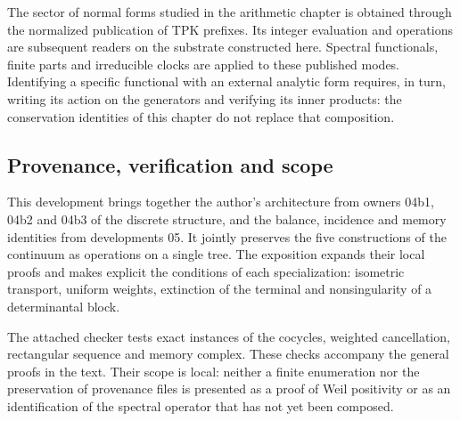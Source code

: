 The sector of normal forms studied in the arithmetic chapter is obtained through the normalized publication of TPK prefixes. Its integer evaluation and operations are subsequent readers on the substrate constructed here. Spectral functionals, finite parts and irreducible clocks are applied to these published modes. Identifying a specific functional with an external analytic form requires, in turn, writing its action on the generators and verifying its inner products: the conservation identities of this chapter do not replace that composition.

\clearpage
\subsection{Provenance, verification and scope}
This development brings together the author's architecture from owners 04b1, 04b2 and 04b3 of the discrete structure, and the balance, incidence and memory identities from developments 05. It jointly preserves the five constructions of the continuum as operations on a single tree. The exposition expands their local proofs and makes explicit the conditions of each specialization: isometric transport, uniform weights, extinction of the terminal and nonsingularity of a determinantal block.

The attached checker tests exact instances of the cocycles, weighted cancellation, rectangular sequence and memory complex. These checks accompany the general proofs in the text. Their scope is local: neither a finite enumeration nor the preservation of provenance files is presented as a proof of Weil positivity or as an identification of the spectral operator that has not yet been composed.
